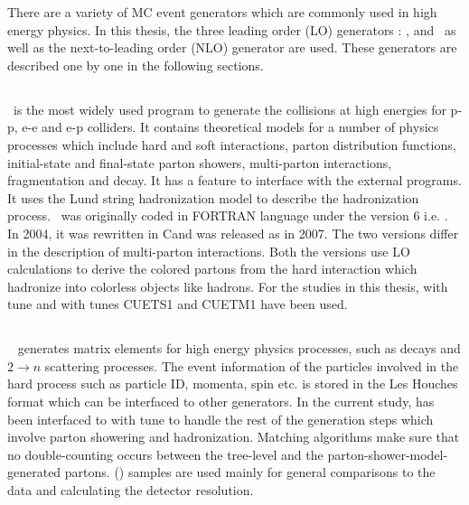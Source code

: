There are a variety of MC event generators which are commonly used in high energy physics. In this thesis, the three leading order (LO) generators : \PYTHIA, \MadGraphF and \HERWIG~as well as the next-to-leading order (NLO) generator \POWHEG are used. These generators are described one by one in the following sections.

\subsection{\PYTHIA}
\PYTHIA~is the most widely used program to generate the collisions at high energies for p-p, e-e and e-p colliders. It contains theoretical models for a number of physics processes which include hard and soft interactions, parton distribution functions, initial-state and final-state parton showers, multi-parton interactions, fragmentation and decay. It has a feature to interface with the external programs. It uses the Lund string hadronization model \cite{Lund} to describe the hadronization process. \PYTHIA~was originally coded in FORTRAN language under the version 6 i.e. \PYTHIAS \cite{Sjostrand:2006za}. In 2004, it was rewritten in C\plusn\plus and was released as \PYTHIAE \cite{Sjostrand:2007gs} in 2007. The two versions differ in the description of multi-parton interactions. Both the versions use LO calculations to derive the colored partons from the hard interaction which hadronize into colorless objects like hadrons. For the studies in this thesis, \PYTHIAS with tune \Ztwostar \cite{Field:2011iq} and \PYTHIAE with tunes CUETS1 and CUETM1 \cite{Khachatryan:2015pea} have been used. 

\subsection{\MadGraphF}
\MadGraphF~\cite{Alwall:2011uj} generates matrix elements for high energy physics processes, such as decays and $2 \rightarrow n$ scattering processes. The event information of the particles involved in the hard process such as particle ID, momenta, spin etc. is stored in the Les Houches format \cite{Alwall:2006yp} which can be interfaced to other generators. In the current study, \MadGraphF has been interfaced to \PYTHIAS with tune \Ztwostar to handle the rest of the generation steps which involve parton showering and hadronization. Matching algorithms make sure that no double-counting occurs between the tree-level and the parton-shower-model-generated partons. \MadGraphFn\plusn \PYTHIAS (\MGP) samples are used mainly for general comparisons to the data and calculating the detector resolution. 

